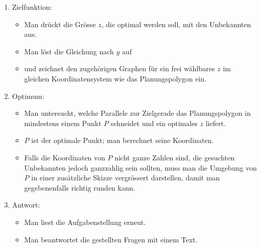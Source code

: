 \documentclass[%
11pt,%
twoside,%
titlepage,%
swissgerman,%
headsepline%
]{scrartcl}
\theoremstyle{definition}
\theoremstyle{plain}
\begin{document}
\begin{enumerate}
  \item Zielfunktion:
  \begin{itemize}
    \item Man drückt die Grösse $z$, die optimal werden soll, mit
    den Unbekannten aus.
    \item Man löst die Gleichung nach $y$ auf
    \item und zeichnet den zugehörigen Graphen für ein frei
    wählbares $z$ im gleichen Koordinatensystem wie das
    Planungspolygon ein.
  \end{itemize}
  \item Optimum:
  \begin{itemize}
    \item Man untersucht, welche Parallele zur Zielgerade das
    Planungspolygon in mindestens einem Punkt $P$ schneidet und ein
    optimales $z$ liefert.
    \item $P$ ist der optimale Punkt; man berechnet seine
    Koordinaten.
    \item Falls die Koordinaten von $P$ nicht ganze Zahlen sind, die
    gesuchten Unbekannten jedoch ganzzahlig sein sollten, muss man
    die Umgebung von $P$ in einer zusätzliche Skizze vergrössert
    darstellen, damit man gegebenenfalls richtig runden kann.
  \end{itemize}
  \item Antwort:
  \begin{itemize}
    \item Man liest die Aufgabenstellung erneut.
    \item Man beantwortet die gestellten Fragen mit einem Text.
  \end{itemize}

\end{enumerate}

\clearpage
\listoffigures
%
%
\end{document}
